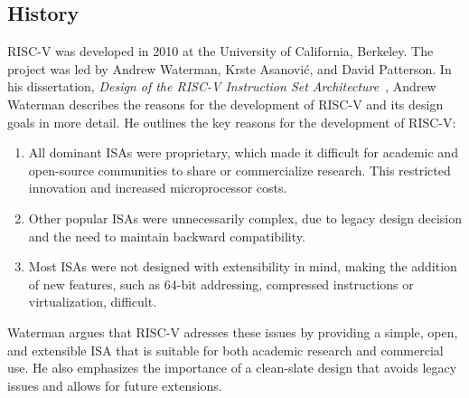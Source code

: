 \documentclass[sigconf]{acmart}
\begin{document}
\subsection{History}
RISC-V was developed in 2010 at the University of California, Berkeley. The project was led by Andrew Waterman, Krste Asanović, and David Patterson.
In his dissertation, \textit{Design of the RISC-V Instruction Set Architecture}~\cite{waterman2016risc}, Andrew Waterman describes the reasons for the development of RISC-V and its design goals in more detail.
He outlines the key reasons for the development of RISC-V:
\begin{enumerate}
    \item All dominant ISAs were proprietary, which made it difficult for academic and open-source communities to share or commercialize research. This restricted innovation and increased microprocessor costs.
    \item Other popular ISAs were unnecessarily complex, due to legacy design decision and the need to maintain backward compatibility.
    \item Most ISAs were not designed with extensibility in mind, making the addition of new features, such as 64-bit addressing, compressed instructions or virtualization, difficult.
\end{enumerate}
Waterman argues that RISC-V adresses these issues by providing a simple, open, and extensible ISA that is suitable for both academic research and commercial use. He also emphasizes the importance of a clean-slate design that avoids legacy issues and allows for future extensions. \cite{waterman2016risc}
\end{document}

